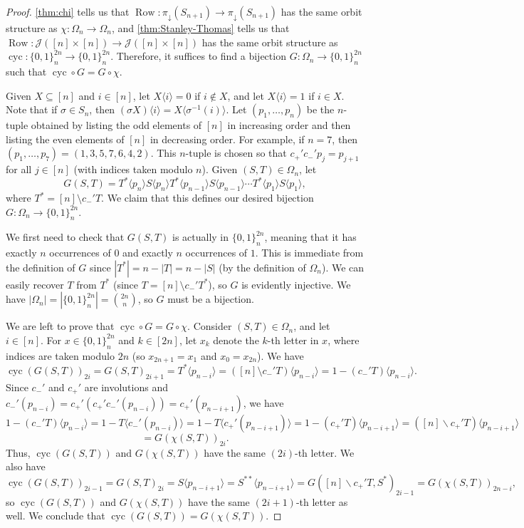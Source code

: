 \documentclass[11pt]{amsart}
\newcommand{\cyc}{\operatorname{cyc}}
\theoremstyle{definition}
\DeclareMathOperator{\row}{Row}
\begin{document}
\begin{proof}
\cref{thm:chi} tells us that $\row\colon\pi_\downarrow(S_{n+1})\to \pi_\downarrow(S_{n+1})$ has the same orbit structure as $\chi\colon\Omega_n\to\Omega_n$, and \cref{thm:Stanley-Thomas} tells us that ${\row}\colon\mathcal J([n]\times[n])\to \mathcal J([n]\times[n])$ has the same orbit structure as $\cyc\colon\{0,1\}_n^{2n}\to\{0,1\}_n^{2n}$. Therefore, it suffices to find a bijection $G\colon\Omega_n\to\{0,1\}_n^{2n}$ such that $\cyc\circ G=G\circ\chi$. 
    
Given $X\subseteq[n]$ and $i\in[n]$, let $X\langle i\rangle=0$ if $i\not\in X$, and let $X\langle i\rangle=1$ if $i\in X$. Note that if $\sigma\in S_n$, then $(\sigma X)\langle i\rangle=X\langle\sigma^{-1}(i)\rangle$. Let $(p_1,\ldots,p_n)$ be the $n$-tuple obtained by listing the odd elements of $[n]$ in increasing order and then listing the even elements of $[n]$ in decreasing order. For example, if $n=7$, then $(p_1,\ldots,p_7)=(1,3,5,7,6,4,2)$. This $n$-tuple is chosen so that $c_+'c_-'p_{j}=p_{j+1}$ for all $j\in[n]$ (with indices taken modulo $n$). Given $(S,T)\in\Omega_n$, let \[G(S,T)=T^*\langle p_n\rangle S\langle p_n\rangle T^*\langle p_{n-1}\rangle S\langle p_{n-1}\rangle\cdots T^*\langle p_1\rangle S\langle p_1\rangle,\] where $T^*=[n]\setminus c_-'T$. We claim that this defines our desired bijection $G\colon\Omega_n\to\{0,1\}_n^{2n}$. 

We first need to check that $G(S,T)$ is actually in $\{0,1\}_n^{2n}$, meaning that it has exactly $n$ occurrences of $0$ and exactly $n$ occurrences of $1$. This is immediate from the definition of $G$ since $|T^*|=n-|T|=n-|S|$ (by the definition of $\Omega_n$). We can easily recover $T$ from $T^*$ (since $T=[n]\setminus c_-'T^*$), so $G$ is evidently injective. We have $|\Omega_n|=|\{0,1\}_n^{2n}|=\binom{2n}{n}$, so $G$ must be a bijection.   

We are left to prove that $\cyc\circ G=G\circ\chi$. Consider $(S,T)\in\Omega_n$, and let $i\in[n]$. 
For $x\in\{0,1\}_n^{2n}$ and $k\in[2n]$, let $x_k$ denote the $k$-th letter in $x$, where indices are taken modulo $2n$ (so $x_{2n+1}=x_1$ and $x_0=x_{2n}$). We have \[\cyc(G(S,T))_{2i}=G(S,T)_{2i+1}=T^*\langle p_{n-i}\rangle=([n]\setminus c_-'T)\langle p_{n-i}\rangle=1-(c_-'T)\langle p_{n-i}\rangle.\] Since $c_-'$ and $c_+'$ are involutions and $c_-'(p_{n-i})=c_+'(c_+'c_-'(p_{n-i}))=c_+'(p_{n-i+1})$, we have \[1-(c_-'T)\langle p_{n-i}\rangle = 1-T\langle c_-'(p_{n-i})\rangle=1-T\langle c_+'(p_{n-i+1})\rangle=1-(c_+'T)\langle p_{n-i+1}\rangle = ([n]\backslash c_+'T)\langle p_{n-i+1}\rangle\]\[=G(\chi(S,T))_{2i}.\] Thus, $\cyc(G(S,T))$ and $G(\chi(S,T))$ have the same $(2i)$-th letter. We also have \[\cyc(G(S,T))_{2i-1}=G(S,T)_{2i}=S\langle p_{n-i+1}\rangle=S^{**}\langle p_{n-i+1}\rangle = G([n]\backslash c_+'T,S^*)_{2i-1}=G(\chi(S,T))_{2n-i},\] so $\cyc(G(S,T))$ and $G(\chi(S,T))$ have the same $(2i+1)$-th letter as well. We conclude that $\cyc(G(S,T))=G(\chi(S,T))$.
\end{proof}
\end{document}
